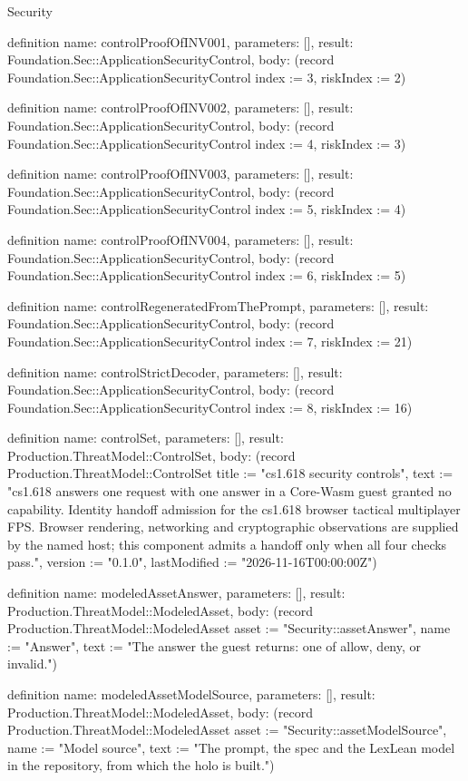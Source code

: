 \begin{lexlean}{Security}
\begin{semanticmodule}
definition{
  name: controlProofOfINV001,
  parameters: [],
  result: Foundation.Sec::ApplicationSecurityControl,
  body: (record Foundation.Sec::ApplicationSecurityControl {index := 3, riskIndex := 2})
}

definition{
  name: controlProofOfINV002,
  parameters: [],
  result: Foundation.Sec::ApplicationSecurityControl,
  body: (record Foundation.Sec::ApplicationSecurityControl {index := 4, riskIndex := 3})
}

definition{
  name: controlProofOfINV003,
  parameters: [],
  result: Foundation.Sec::ApplicationSecurityControl,
  body: (record Foundation.Sec::ApplicationSecurityControl {index := 5, riskIndex := 4})
}

definition{
  name: controlProofOfINV004,
  parameters: [],
  result: Foundation.Sec::ApplicationSecurityControl,
  body: (record Foundation.Sec::ApplicationSecurityControl {index := 6, riskIndex := 5})
}

definition{
  name: controlRegeneratedFromThePrompt,
  parameters: [],
  result: Foundation.Sec::ApplicationSecurityControl,
  body: (record Foundation.Sec::ApplicationSecurityControl {index := 7, riskIndex := 21})
}

definition{
  name: controlStrictDecoder,
  parameters: [],
  result: Foundation.Sec::ApplicationSecurityControl,
  body: (record Foundation.Sec::ApplicationSecurityControl {index := 8, riskIndex := 16})
}

definition{
  name: controlSet,
  parameters: [],
  result: Production.ThreatModel::ControlSet,
  body: (record Production.ThreatModel::ControlSet {title := "cs1.618 security controls", text := "cs1.618 answers one request with one answer in a Core-Wasm guest granted no capability. Identity handoff admission for the cs1.618 browser tactical multiplayer FPS. Browser rendering, networking and cryptographic observations are supplied by the named host; this component admits a handoff only when all four checks pass.", version := "0.1.0", lastModified := "2026-11-16T00:00:00Z"})
}

definition{
  name: modeledAssetAnswer,
  parameters: [],
  result: Production.ThreatModel::ModeledAsset,
  body: (record Production.ThreatModel::ModeledAsset {asset := "Security::assetAnswer", name := "Answer", text := "The answer the guest returns: one of allow, deny, or invalid."})
}

definition{
  name: modeledAssetModelSource,
  parameters: [],
  result: Production.ThreatModel::ModeledAsset,
  body: (record Production.ThreatModel::ModeledAsset {asset := "Security::assetModelSource", name := "Model source", text := "The prompt, the spec and the LexLean model in the repository, from which the holo is built."})
}


\end{semanticmodule}
\end{lexlean}
